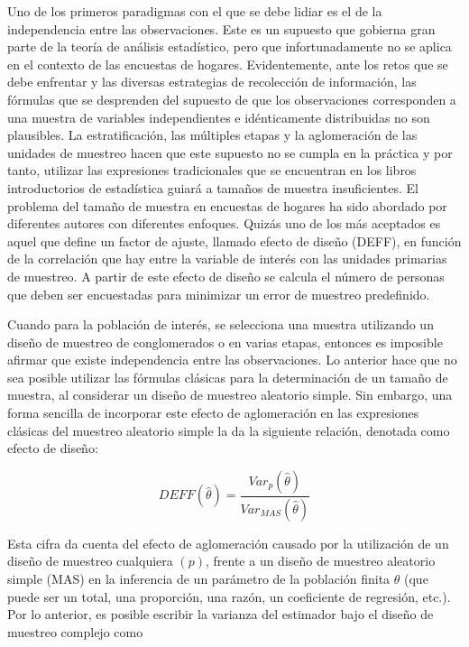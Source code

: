 \documentclass[
  12pt,
  spanish,
]{book}
\begin{document}
Uno de los primeros paradigmas con el que se debe lidiar es el de la independencia entre las observaciones. Este es un supuesto que gobierna gran parte de la teoría de análisis estadístico, pero que infortunadamente no se aplica en el contexto de las encuestas de hogares. Evidentemente, ante los retos que se debe enfrentar y las diversas estrategias de recolección de información, las fórmulas que se desprenden del supuesto de que los observaciones corresponden a una muestra de variables independientes e idénticamente distribuidas no son plausibles. La estratificación, las múltiples etapas y la aglomeración de las unidades de muestreo hacen que este supuesto no se cumpla en la práctica y por tanto, utilizar las expresiones tradicionales que se encuentran en los libros introductorios de estadística guiará a tamaños de muestra insuficientes. El problema del tamaño de muestra en encuestas de hogares ha sido abordado por diferentes autores con diferentes enfoques. Quizás uno de los más aceptados es aquel que define un factor de ajuste, llamado efecto de diseño (DEFF), en función de la correlación que hay entre la variable de interés con las unidades primarias de muestreo. A partir de este efecto de diseño se calcula el número de personas que deben ser encuestadas para minimizar un error de muestreo predefinido.

Cuando para la población de interés, se selecciona una muestra utilizando un diseño de muestreo de conglomerados o en varias etapas, entonces es imposible afirmar que existe independencia entre las observaciones. Lo anterior hace que no sea posible utilizar las fórmulas clásicas para la determinación de un tamaño de muestra, al considerar un diseño de muestreo aleatorio simple. Sin embargo, una forma sencilla de incorporar este efecto de aglomeración en las expresiones clásicas del muestreo aleatorio simple la da la siguiente relación, denotada como efecto de diseño:

\begin{equation}
DEFF(\hat{\theta})=\frac{Var_p(\hat{\theta})}{Var_{MAS}(\hat{\theta})}
\end{equation}

Esta cifra da cuenta del efecto de aglomeración causado por la utilización de un diseño de muestreo cualquiera \((p)\), frente a un diseño de muestreo aleatorio simple (MAS) en la inferencia de un parámetro de la población finita \(\theta\) (que puede ser un total, una proporción, una razón, un coeficiente de regresión, etc.). Por lo anterior, es posible escribir la varianza del estimador bajo el diseño de muestreo complejo como
\end{document}
